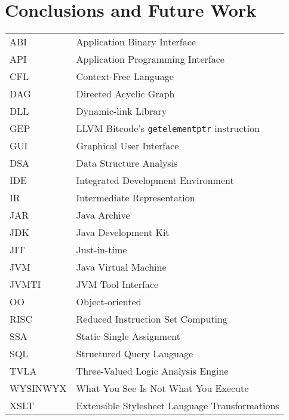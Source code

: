 \documentclass[inscr,ack,preface]{diphdthesis}
\newcommand{\code}[1]{\texttt{#1}}
\begin{document}
\chapter{Conclusions and Future Work}




\backmatter


\abbreviations
\begin{center}
	\renewcommand{\arraystretch}{1.5}
	\begin{longtable}{ l @{\qquad} l }
      \toprule
      ABI      & Application Binary Interface \\
      API      & Application Programming Interface \\
      CFL      & Context-Free Language \\
      DAG      & Directed Acyclic Graph \\
      DLL      & Dynamic-link Library \\
      GEP      & LLVM Bitcode's \code{getelementptr} instruction \\
      GUI      & Graphical User Interface \\
      DSA      & Data Structure Analysis \\
      IDE      & Integrated Development Environment \\
      IR       & Intermediate Representation \\
      JAR      & Java Archive \\
      JDK      & Java Development Kit \\
      JIT      & Just-in-time \\
      JVM      & Java Virtual Machine \\
      JVMTI    & JVM Tool Interface \\
      OO       & Object-oriented \\
      RISC     & Reduced Instruction Set Computing \\
      SSA      & Static Single Assignment \\
      SQL      & Structured Query Language \\
      TVLA     & Three-Valued Logic Analysis Engine \\
      WYSINWYX & What You See Is Not What You Execute \\
      XSLT     & Extensible Stylesheet Language Transformations \\
      \bottomrule
	\end{longtable}
\end{center}
\end{document}
